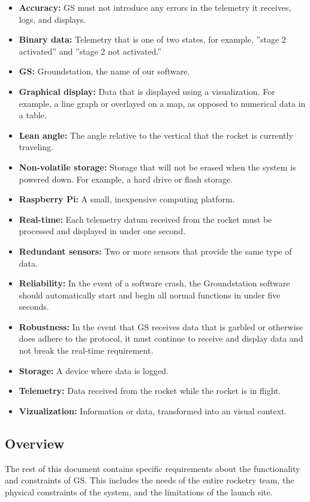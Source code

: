 \documentclass[10pt,journal,draftclsnofoot,onecolumn]{IEEEtran}
\begin{document}
	\begin{itemize}
		\item \textbf{Accuracy:} GS must not introduce any errors in the telemetry it receives, logs, and displays.
		\item \textbf{Binary data:} Telemetry that is one of two states, for example, ''stage 2 activated'' and
		''stage 2 not activated.''
		\item \textbf{GS:} Groundstation, the name of our software.
		\item \textbf{Graphical display:} Data that is displayed using a visualization. For example, a line graph or overlayed
		on a map, as opposed to numerical data in a table.
		\item \textbf{Lean angle:} The angle relative to the vertical that the rocket is currently traveling.
		\item \textbf{Non-volatile storage:} Storage that will not be erased when the system is powered down.
		For example, a hard drive or flash storage.
		\item \textbf{Raspberry Pi:} A small, inexpensive computing platform.		
		\item \textbf{Real-time:} Each telemetry datum received from the rocket must be processed and
		displayed in under one second.
		\item \textbf{Redundant sensors:} Two or more sensors that provide the same type of data.
		\item \textbf{Reliability:} In the event of a software crash, the Groundstation software should automatically
		start and begin all normal functions in under five seconds.
		\item \textbf{Robustness:} In the event that GS receives data that is garbled or otherwise does adhere
		to the protocol, it must continue to receive and display data and not break the real-time requirement.
		\item \textbf{Storage:} A device where data is logged.		
		\item \textbf{Telemetry:} Data received from the rocket while the rocket is in flight.		
		\item \textbf{Vizualization:} Information or data, transformed into an visual context.
	\end{itemize}	
	
	\subsection{Overview}
	The rest of this document contains specific requirements about the functionality and constraints of GS. This includes
	the needs of the entire rocketry team, the physical constraints of the system, and the limitations of the launch site.
	
\end{document}
